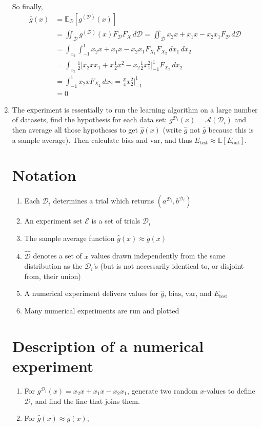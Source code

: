 \documentclass[12pt]{article}
\newcommand{\Data}{\mathcal{D}}
\newcommand{\Exmt}{\mathcal{E}}
\newcommand{\Expect}{\mathbb{E}}
\newcommand{\ErrOut}{E_{\text{out}}}
\newcommand{\ApxErrOut}{E_{\text{test}}}
\newcommand{\Bias}{\bm{\mathrm{bias}}}
\newcommand{\Var}{\bm{\mathrm{var}}}
\newcommand{\gD}{g^{(\Data)}}
\begin{document}
\begin{enumerate}
    So finally,
    \begin{align*}
    \bar{g}(x) &= \Expect_{\Data}[\gD(x)] \\
         &=
         \iint_{\Data} \gD(x) F_{\Data}F_{X} \,d\Data 
         =
         \iint_{\Data} x_{2}x + x_{1}x - x_{2}x_{1} F_{\Data} \, d\Data \\
         &= 
         \int_{x_{2}} \int_{-1}^{1} x_{2}x + x_{1}x - x_{2}x_{1} F_{X_{1}} F_{X_{2}} \, dx_{1} \, dx_{2} \\
         &=
         \int_{x_{2}} \frac{1}{2} \biggl[ x_{2}xx_{1} + x\frac{1}{2}x^{2} - x_{2}\frac{1}{2}x_{1}^{2} \biggr]_{-1}^{1}F_{X_{2}}\, dx_{2} \\
         &=
         \int_{-1}^{1} x_{2}x F_{X_{2}}\, dx_{2}
         =
         \frac{x}{4} x_{2}^{2} \biggr|_{-1}^{1} \\
         &= 0
    \end{align*}
\pagebreak
    \item The experiment is essentially to run the learning algorithm on a large number of datasets, find the hypothesis for each data set: $g^{\Data_{i}}(x) = \mathcal{A}(\Data_{i})$ and then average all those hypotheses to get $\hat{g}(x)$ (write $\hat{g}$ not $\bar{g}$ because this is a sample average).  Then calculate $\Bias$ and $\Var$, and thus $\ApxErrOut \approx \Expect[\ErrOut]$.
    \section{Notation}
    \begin{enumerate}
        \item Each $\Data_{i}$ determines a trial which returns $(a^{\Data_{i}}, b^{\Data_{i}})$
        \item An experiment set $\Exmt$ is a set of trials $\Data_{i}$
        \item The sample average function $\hat{g}(x) \approx \bar{g}(x)$
        \item $\widehat{\Data}$ denotes a set of $x$ values drawn independently from the same distribution as the $\Data_{i}$'s (but is not necessarily identical to, or disjoint from, their union)
        \item A numerical experiment delivers values for $\hat{g}$, $\Bias$, $\Var$, and $\ApxErrOut$
        \item Many numerical experiments are run and plotted
        \end{enumerate}
        
        \section{Description of a numerical experiment}
        \begin{enumerate}
        \item For $g^{\Data_{i}}(x) = x_{2}x + x_{1}x - x_{2}x_{1}$, generate two random $x$-values to define $\Data_{i}$ and find the line that joins them.
        \item For $\hat{g}(x) \approx \bar{g}(x)$, 
        

\end{enumerate}
\end{enumerate}
\end{document}
